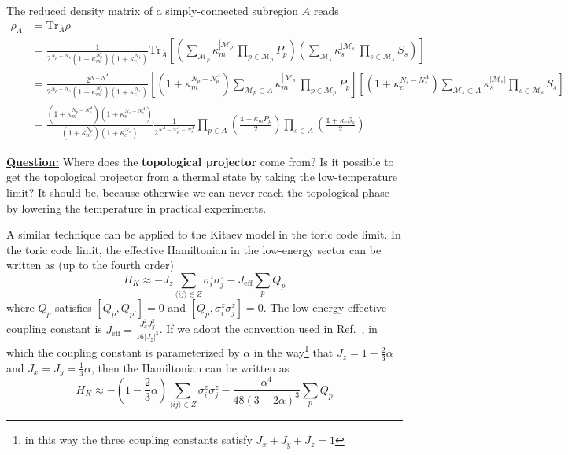 \documentclass[12font]{article}
\numberwithin{equation}{section}    %
\theoremstyle{definition}
\newcommand{\anglelr}[1]{\langle #1 \rangle}
\newcommand{\lr}[1]{\left(  #1  \right)}
\newcommand{\lrm}[1]{\left[  #1  \right]}
\newcommand{\abs}[1]{\left|  #1  \right|}
\newcommand{\mrm}[1]{\mathrm{#1}}
\newcommand{\alert}[1]{{\color{red}#1}}
\newcommand{\Tr}{\mrm{Tr}}
\begin{document}
The reduced density matrix of a simply-connected subregion $A$ reads
\begin{align}\label{eq:TC-RDM-finite-T}
\rho_A 
&= 
\Tr_{\overline{A}}\rho \nonumber\\
&=
\frac{1}
{
    2^{N_p + N_s}
    \lr{1 + \kappa_m^{N_p}} 
    \lr{1 + \kappa_e^{N_s}} 
}
\Tr_{\overline{A}}
\lrm{
    \lr{
        \sum_{\mathcal{M}_p}\kappa_m^{\abs{\mathcal{M}_p}}
        \prod_{p\in\mathcal{M}_p} P_p
    }
    \lr{
        \sum_{\mathcal{M}_s}\kappa_s^{\abs{\mathcal{M}_s}}
        \prod_{s\in\mathcal{M}_s} S_s
    } 
} \nonumber\\
&= 
\frac{2^{N - N^A}}
{
    2^{N_p + N_s}
    \lr{1 + \kappa_m^{N_p}} 
    \lr{1 + \kappa_e^{N_s}} 
}
\lrm{
\lr{1 + \kappa_m^{N_p - N_p^A}}
    \sum_{\mathcal{M}_p\subset A}\kappa_m^{\abs{\mathcal{M}_p}}
    \prod_{p\in\mathcal{M}_p} P_p
}
\lrm{
    \lr{1 + \kappa_e^{N_s - N_s^A}} \sum_{\mathcal{M}_s \subset A} \kappa_s^{\abs{\mathcal{M}_s}}
    \prod_{s\in\mathcal{M}_s} S_s
} \nonumber \\
&= 
\frac{
    \lr{1 + \kappa_m^{N_p - N_p^A}}
    \lr{1 + \kappa_e^{N_s - N_s^A}}
}
{
    \lr{1 + \kappa_m^{N_p}} 
    \lr{1 + \kappa_e^{N_s}} 
}
\frac{1}{2^{N^A - N^A_p - N^A_s}}
\prod_{p\in A}
\lr{\frac{\mathds{1} + \kappa_m P_p}{2}}
\prod_{s\in A}
\lr{\frac{\mathds{1} + \kappa_e S_s}{2}}
\end{align}


\alert{\textbf{\underline{Question:}} Where does the \textbf{topological projector} come from? Is it possible to get the topological projector from a thermal state by taking the low-temperature limit? It should be, because otherwise we can never reach the topological phase by lowering the temperature in practical experiments.}

A similar technique can be applied to the Kitaev model in the toric code limit. In the toric code limit, the effective Hamiltonian in the low-energy sector can be written as (up to the fourth order)~\cite{Kitaev_2006}
\begin{equation}\label{eq:eff-model}
    H_K \approx - J_z \sum_{\anglelr{ij} \in Z} \sigma^z_i\sigma^z_j
-
J_{\mrm{eff}} \sum_{p} Q_p
\end{equation}
where $Q_p$ satisfies $[Q_p,Q_{p'}]=0$ and $[Q_p, \sigma^z_i\sigma^z_j]=0$. The low-energy effective coupling constant is $J_{\mrm{eff}} = \frac{J_x^2 J_y^2}{16\abs{J_z}^3}$. If we adopt the convention used in Ref.~\cite{Nasu-Udagawa-Motome_2015}, in which the coupling constant is parameterized by $\alpha$ in the way\footnote{in this way the three coupling constants satisfy $J_x + J_y + J_z = 1$} that $J_z = 1 - \frac{2}{3}\alpha$ and $J_x = J_y = \frac{1}{3}\alpha$, then the Hamiltonian can be written as
\begin{equation}\label{eq:eff-model-alpha}
    H_K \approx - \lr{1 - \frac{2}{3}\alpha} \sum_{\anglelr{ij} \in Z} \sigma^z_i\sigma^z_j
-
\frac{\alpha^4}{48\lr{3-2\alpha}^3} \sum_{p} Q_p
\end{equation}
\end{document}
